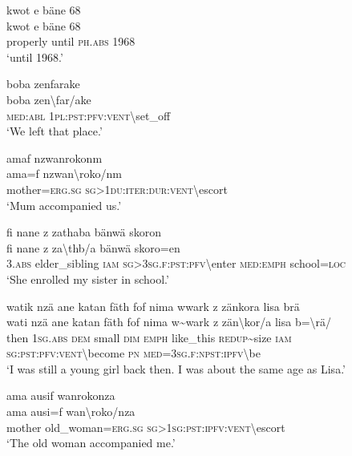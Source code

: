 \ea\label{ex:14:a3057}
kwot e bäne 68\\
\gll kwot	e	bäne	68\\
     properly	until	\textsc{ph}.\textsc{abs}	1968\\
\glt `until 1968.'
\z

\ea\label{ex:14:a3061}
boba zenfarake\\
\gll boba	zen{\textbackslash}far/ake\\
     \textsc{med}:\textsc{abl}	1\textsc{pl}:\textsc{pst}:\textsc{pfv}:\textsc{vent}{\textbackslash}set\_off\\
\glt `We left that place.'
\z

\ea\label{ex:14:a3063}
amaf nzwanrokonm\\
\gll ama=f	nzwan{\textbackslash}roko/nm\\
     mother=\textsc{erg}.\textsc{sg}	\textsc{sg}>1\textsc{du}:\textsc{iter}:\textsc{dur}:\textsc{vent}{\textbackslash}escort\\
\glt `Mum accompanied us.'
\z

\ea\label{ex:14:a3065}
fi nane z zathaba bänwä skoron\\
\gll fi	nane	z	za{\textbackslash}thb/a	bänwä	skoro=en\\
     3.\textsc{abs}	elder\_sibling	\textsc{iam}	\textsc{sg}>3\textsc{sg}.\textsc{f}:\textsc{pst}:\textsc{pfv}{\textbackslash}enter	\textsc{med}:\textsc{emph}	school=\textsc{loc}\\
\glt `She enrolled my sister in school.'
\z

\ea\label{ex:14:a3067}
watik nzä ane katan fäth fof nima wwark z zänkora lisa brä\\
\gll wati	nzä	ane	katan	fäth	fof	nima	w{\textasciitilde}wark	z	zän{\textbackslash}kor/a	lisa	b={\textbackslash}rä/\\
     then	1\textsc{sg}.\textsc{abs}	\textsc{dem}	small	\textsc{dim}	\textsc{emph}	like\_this	\textsc{redup}{\textasciitilde}size	\textsc{iam}	\textsc{sg}:\textsc{pst}:\textsc{pfv}:\textsc{vent}{\textbackslash}become	\textsc{pn}	\textsc{med}=3\textsc{sg}.\textsc{f}:\textsc{npst}:\textsc{ipfv}{\textbackslash}be\\
\glt `I was still a young girl back then. I was about the same age as Lisa.'
\z

\ea\label{ex:14:a3069}
ama ausif wanrokonza\\
\gll ama	ausi=f	wan{\textbackslash}roko/nza\\
     mother	old\_woman=\textsc{erg}.\textsc{sg}	\textsc{sg}>1\textsc{sg}:\textsc{pst}:\textsc{ipfv}:\textsc{vent}{\textbackslash}escort\\
\glt `The old woman accompanied me.'
\z

